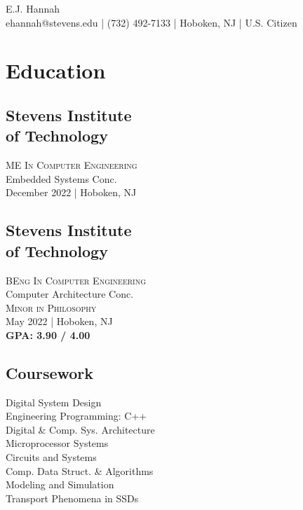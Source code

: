 \documentclass[a4paper, 11pt]{article}
\makeatletter
\renewcommand{\maketitle}{
\begin{center}
{\Huge\color{titles}E.J. }{\Huge\color{titles} Hannah}\\
\vspace{0.35em}
ehannah@stevens.edu | (732) 492-7133 | Hoboken, NJ | U.S. Citizen
\end{center}
}
\makeatother
\begin{document}
\author{E.J. Hannah}
\maketitle
\vspace{-0.5em}
\makebox[\linewidth]{\rule{\paperwidth}{0.4pt}}
\begin{minipage}[h]{0.33\textwidth}
\vspace{-2em}
\section{Education}
\subsection{Stevens Institute\\ of Technology\\}
\hspace{-7pt}\textsc{ME In Computer Engineering}\\
Embedded Systems Conc.\\
\textcolor{location}{December 2022 | Hoboken, NJ}\\

\subsection{Stevens Institute\\ of Technology\\}
\hspace{-6pt}\textsc{BEng In Computer Engineering}\\
Computer Architecture Conc.\\
\textsc{Minor in Philosophy}\\
\textcolor{location}{May 2022 | Hoboken, NJ}\\
\textbf{\textcolor{location}{GPA: 3.90 / 4.00}}\\

\subsection{Coursework\\}
\hspace{-6pt}\textcolor{location}{Digital System Design\\
Engineering Programming: C++\\
Digital \& Comp. Sys. Architecture\\
Microprocessor Systems\\
Circuits and Systems\\
Comp. Data Struct. \& Algorithms\\
Modeling and Simulation\\
Transport Phenomena in SSDs\\}


\end{minipage}
\end{document}
